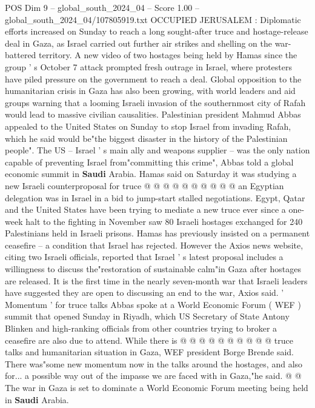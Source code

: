 \begin{textsample}{POS Dim 9 – global\_south\_2024\_04 – Score 1.00 – global\_south\_2024\_04/107805919.txt}  \label{ex:f9_pos_124}
OCCUPIED JERUSALEM : Diplomatic efforts increased on Sunday to reach a long sought-after truce and hostage-release deal in Gaza, as Israel carried out further air strikes and shelling on the war-battered territory.
A new video of two hostages being held by Hamas since the group ' s October 7 attack prompted fresh outrage in Israel, where protesters have piled pressure on the government to reach a deal.
Global opposition to the humanitarian crisis in Gaza has also been growing, with world leaders and aid groups warning that a looming Israeli invasion of the southernmost city of Rafah would lead to massive civilian causalities.
Palestinian president Mahmud Abbas appealed to the United States on Sunday to stop Israel from invading Rafah, which he said would be"the biggest disaster in the history of the Palestinian people".
The US -- Israel ' s main ally and weapons supplier -- was the only nation capable of preventing Israel from"committing this crime", Abbas told a global economic summit in \textbf{Saudi} Arabia.
Hamas said on Saturday it was studying a new Israeli counterproposal for truce @ @ @ @ @ @ @ @ @ @ an Egyptian delegation was in Israel in a bid to jump-start stalled negotiations.
Egypt, Qatar and the United States have been trying to mediate a new truce ever since a one-week halt to the fighting in November saw 80 Israeli hostages exchanged for 240 Palestinians held in Israeli prisons.
Hamas has previously insisted on a permanent ceasefire -- a condition that Israel has rejected.
However the Axios news website, citing two Israeli officials, reported that Israel ' s latest proposal includes a willingness to discuss the"restoration of sustainable calm"in Gaza after hostages are released.
It is the first time in the nearly seven-month war that Israeli leaders have suggested they are open to discussing an end to the war, Axios said. ' Momentum ' for truce talks Abbas spoke at a World Economic Forum ( WEF ) summit that opened Sunday in Riyadh, which US Secretary of State Antony Blinken and high-ranking officials from other countries trying to broker a ceasefire are also due to attend.
While there is @ @ @ @ @ @ @ @ @ @ truce talks and humanitarian situation in Gaza, WEF president Borge Brende said.
There was"some new momentum now in the talks around the hostages, and also for... a possible way out of the impasse we are faced with in Gaza,"he said. @ @ The war in Gaza is set to dominate a World Economic Forum meeting being held in \textbf{Saudi} Arabia.

\end{textsample}

